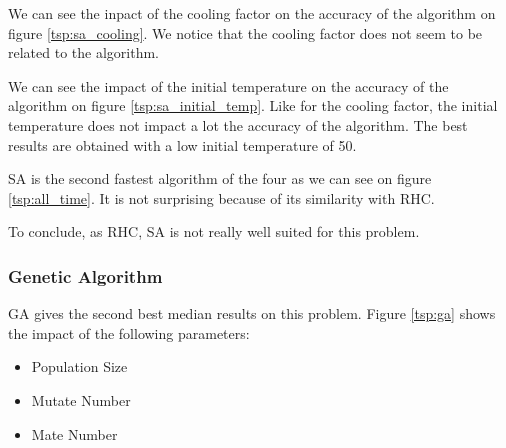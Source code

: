 \documentclass[10pt]{article}
\begin{document}
				We can see the inpact of the cooling factor on the accuracy of the algorithm on figure \ref{tsp:sa_cooling}. We notice that the cooling factor does not seem to be related to the algorithm.

				We can see the impact of the initial temperature on the accuracy of the algorithm on figure \ref{tsp:sa_initial_temp}. Like for the cooling factor, the initial temperature does not impact a lot the accuracy of the algorithm. The best results are obtained with a low initial temperature of 50.

				SA is the second fastest algorithm of the four as we can see on figure \ref{tsp:all_time}. It is not surprising because of its similarity with RHC.

				To conclude, as RHC, SA is not really well suited for this problem.
			\subsubsection*{Genetic Algorithm}
				GA gives the second best median results on this problem. Figure \ref{tsp:ga} shows the impact of the following parameters:
				\begin{itemize}
					\item Population Size
					\item Mutate Number
					\item Mate Number
				\end{itemize}
\end{document}
